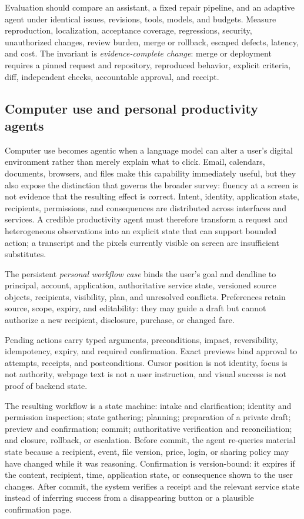 Evaluation should compare an assistant, a fixed repair pipeline, and an adaptive agent under identical issues, revisions, tools, models, and budgets. Measure reproduction, localization, acceptance coverage, regressions, security, unauthorized changes, review burden, merge or rollback, escaped defects, latency, and cost. The invariant is \emph{evidence-complete change}: merge or deployment requires a pinned request and repository, reproduced behavior, explicit criteria, diff, independent checks, accountable approval, and receipt.

\subsection{Computer use and personal productivity agents}

Computer use becomes agentic when a language model can alter a user's digital environment rather than merely explain what to click. Email, calendars, documents, browsers, and files make this capability immediately useful, but they also expose the distinction that governs the broader survey: fluency at a screen is not evidence that the resulting effect is correct. Intent, identity, application state, recipients, permissions, and consequences are distributed across interfaces and services. A credible productivity agent must therefore transform a request and heterogeneous observations into an explicit state that can support bounded action; a transcript and the pixels currently visible on screen are insufficient substitutes.

The persistent \emph{personal workflow case} binds the user's goal and deadline to principal, account, application, authoritative service state, versioned source objects, recipients, visibility, plan, and unresolved conflicts. Preferences retain source, scope, expiry, and editability: they may guide a draft but cannot authorize a new recipient, disclosure, purchase, or changed fare.

Pending actions carry typed arguments, preconditions, impact, reversibility, idempotency, expiry, and required confirmation. Exact previews bind approval to attempts, receipts, and postconditions. Cursor position is not identity, focus is not authority, webpage text is not a user instruction, and visual success is not proof of backend state.

The resulting workflow is a state machine: intake and clarification; identity and permission inspection; state gathering; planning; preparation of a private draft; preview and confirmation; commit; authoritative verification and reconciliation; and closure, rollback, or escalation. Before commit, the agent re-queries material state because a recipient, event, file version, price, login, or sharing policy may have changed while it was reasoning. Confirmation is version-bound: it expires if the content, recipient, time, application state, or consequence shown to the user changes. After commit, the system verifies a receipt and the relevant service state instead of inferring success from a disappearing button or a plausible confirmation page.

